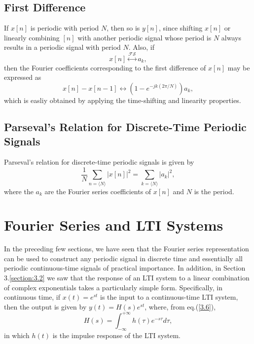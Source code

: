 \documentclass[a4paper,10pt,twoside]{book}
\begin{document}
\subsection{First Difference}

If $x[n]$ is periodic with period $N$, then so is $y[n]$, since shifting $x[n]$ or linearly combining $[n]$ with another periodic signal whose period is $N$ always results in a periodic signal with period $N$. Also, if $$x[n]\overset{\mathcal{FS}}{\longleftrightarrow}a_k,$$ then the Fourier coefficients corresponding to the first difference of $x[n]$ may be expressed as
\begin{equation}
    x[n]-x[n-1]\longleftrightarrow(1-e^{-jk(2\pi/N)})a_k,
    \label{3.109}
\end{equation}
which is easliy obtained by applying the time-shifting and linearity properties.

\subsection{Parseval's Relation for Discrete-Time Periodic Signals}

Parseval's relation for discrete-time periodic signals is given by
\begin{equation}
    \frac1N\sum_{n=\langle N\rangle}|x[n]|^2=\sum_{k=\langle N\rangle}|a_k|^2,
    \label{3.110}
\end{equation}
where the $a_k$ are the Fourier series coefficients of $x[n]$ and $N$ is the period.

\section{Fourier Series and LTI Systems}

In the preceding few sections, we have seen that the Fourier series representation can be used to construct any periodic signal in discrete time and essentially all periodic continuous-time signals of practical importance. In addition, in Section 3.\ref{section:3.2} we saw that the response of an LTI system to a linear combination of complex exponentials takes a particularly simple form. Specifically, in continuous time, if $x(t)=e^{st}$ is the input to a continuous-time LTI system, then the output is given by $y(t)=H(s)e^{st}$, where, from eq.\;(\ref{3.6}),
\begin{equation}
    H(s)=\int_{-\infty}^{+\infty}h(\tau)e^{-s\tau}d\tau,
    \label{3.119}
\end{equation}
in which $h(t)$ is the impulse response of the LTI system.
\end{document}
